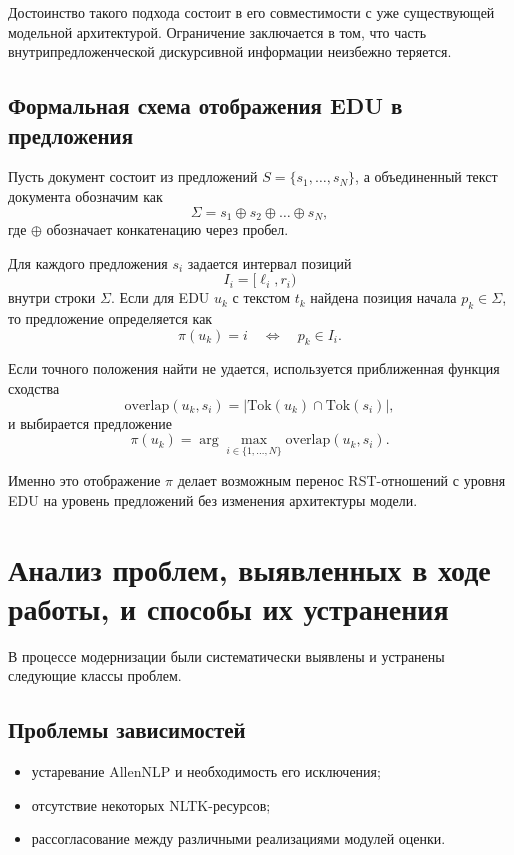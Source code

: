 \documentclass[12pt,a4paper]{article}
\begin{document}
Достоинство такого подхода состоит в его совместимости с уже существующей модельной
архитектурой. Ограничение заключается в том, что часть внутрипредложенческой дискурсивной
информации неизбежно теряется.

\subsection{Формальная схема отображения EDU в предложения}

Пусть документ состоит из предложений $S=\{s_1,\dots,s_N\}$, а объединенный текст
документа обозначим как
\[
\Sigma = s_1 \oplus s_2 \oplus \dots \oplus s_N,
\]
где $\oplus$ обозначает конкатенацию через пробел.

Для каждого предложения $s_i$ задается интервал позиций
\[
I_i = [\ell_i, r_i)
\]
внутри строки $\Sigma$. Если для EDU $u_k$ с текстом $t_k$ найдена позиция начала
$p_k \in \Sigma$, то предложение определяется как
\[
\pi(u_k) = i \quad \Leftrightarrow \quad p_k \in I_i.
\]

Если точного положения найти не удается, используется приближенная функция сходства
\[
\mathrm{overlap}(u_k, s_i) = \left| \mathrm{Tok}(u_k) \cap \mathrm{Tok}(s_i) \right|,
\]
и выбирается предложение
\[
\pi(u_k) = \arg\max_{i \in \{1,\dots,N\}} \mathrm{overlap}(u_k, s_i).
\]

Именно это отображение $\pi$ делает возможным перенос RST-отношений с уровня EDU на
уровень предложений без изменения архитектуры модели.

\section{Анализ проблем, выявленных в ходе работы, и способы их устранения}

В процессе модернизации были систематически выявлены и устранены следующие классы
проблем.

\subsection{Проблемы зависимостей}

\begin{itemize}
    \item устаревание AllenNLP и необходимость его исключения;
    \item отсутствие некоторых NLTK-ресурсов;
    \item рассогласование между различными реализациями модулей оценки.
\end{itemize}
\end{document}
